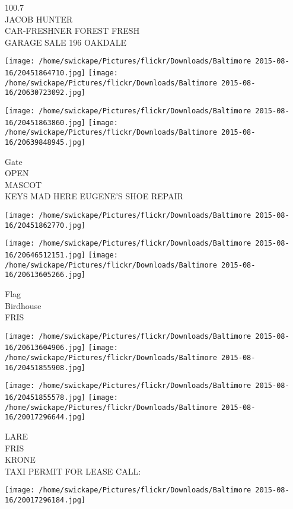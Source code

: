 \documentclass[10pt,letterpaper]{article}
\begin{document}
100.7\\
JACOB HUNTER\\
CAR{-}FRESHNER FOREST FRESH\\
GARAGE SALE 196 OAKDALE\\
\pagebreak

\texttt{[image: /home/swickape/Pictures/flickr/Downloads/Baltimore 2015-08-16/20451864710.jpg]}
\texttt{[image: /home/swickape/Pictures/flickr/Downloads/Baltimore 2015-08-16/20630723092.jpg]}

\texttt{[image: /home/swickape/Pictures/flickr/Downloads/Baltimore 2015-08-16/20451863860.jpg]}
\texttt{[image: /home/swickape/Pictures/flickr/Downloads/Baltimore 2015-08-16/20639848945.jpg]}

Gate\\
OPEN\\
MASCOT\\
KEYS MAD HERE EUGENE'S SHOE REPAIR\\
\pagebreak

\texttt{[image: /home/swickape/Pictures/flickr/Downloads/Baltimore 2015-08-16/20451862770.jpg]}

\vspace{0.25in}
\texttt{[image: /home/swickape/Pictures/flickr/Downloads/Baltimore 2015-08-16/20646512151.jpg]}
\texttt{[image: /home/swickape/Pictures/flickr/Downloads/Baltimore 2015-08-16/20613605266.jpg]}

Flag\\
Birdhouse\\
FRIS\\
\pagebreak

\texttt{[image: /home/swickape/Pictures/flickr/Downloads/Baltimore 2015-08-16/20613604906.jpg]}
\texttt{[image: /home/swickape/Pictures/flickr/Downloads/Baltimore 2015-08-16/20451855908.jpg]}

\texttt{[image: /home/swickape/Pictures/flickr/Downloads/Baltimore 2015-08-16/20451855578.jpg]}
\texttt{[image: /home/swickape/Pictures/flickr/Downloads/Baltimore 2015-08-16/20017296644.jpg]}

LARE\\
FRIS\\
KRONE\\
TAXI PERMIT FOR LEASE CALL:\\
\pagebreak

\texttt{[image: /home/swickape/Pictures/flickr/Downloads/Baltimore 2015-08-16/20017296184.jpg]}
\end{document}
